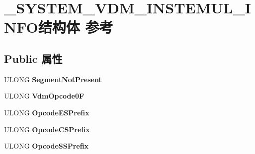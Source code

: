 \hypertarget{struct___s_y_s_t_e_m___v_d_m___i_n_s_t_e_m_u_l___i_n_f_o}{}\section{\+\_\+\+S\+Y\+S\+T\+E\+M\+\_\+\+V\+D\+M\+\_\+\+I\+N\+S\+T\+E\+M\+U\+L\+\_\+\+I\+N\+F\+O结构体 参考}
\label{struct___s_y_s_t_e_m___v_d_m___i_n_s_t_e_m_u_l___i_n_f_o}
\subsection*{Public 属性}
\begin{DoxyCompactItemize}
\item 
\mbox{\label{struct___s_y_s_t_e_m___v_d_m___i_n_s_t_e_m_u_l___i_n_f_o_aa976a7cad131b39f4a21c36434f385be}} 
U\+L\+O\+NG {\bfseries Segment\+Not\+Present}
\item 
\mbox{\label{struct___s_y_s_t_e_m___v_d_m___i_n_s_t_e_m_u_l___i_n_f_o_a7c4f8269704dfd1a77f965cfda1ee219}} 
U\+L\+O\+NG {\bfseries Vdm\+Opcode0F}
\item 
\mbox{\label{struct___s_y_s_t_e_m___v_d_m___i_n_s_t_e_m_u_l___i_n_f_o_ab8cd146799ea3371dde5ad4ab6ad024c}} 
U\+L\+O\+NG {\bfseries Opcode\+E\+S\+Prefix}
\item 
\mbox{\label{struct___s_y_s_t_e_m___v_d_m___i_n_s_t_e_m_u_l___i_n_f_o_a2cdae791e7e4892630a4ebd04c42c8de}} 
U\+L\+O\+NG {\bfseries Opcode\+C\+S\+Prefix}
\item 
\mbox{\label{struct___s_y_s_t_e_m___v_d_m___i_n_s_t_e_m_u_l___i_n_f_o_adf08d7b43be25d37a7e94896ab6ca1cc}} 
U\+L\+O\+NG {\bfseries Opcode\+S\+S\+Prefix}
\item 
\mbox{\label{struct___s_y_s_t_e_m___v_d_m___i_n_s_t_e_m_u_l___i_n_f_o_adc9582f397c9e8145809006fb657797e}} 

\end{DoxyCompactItemize}
